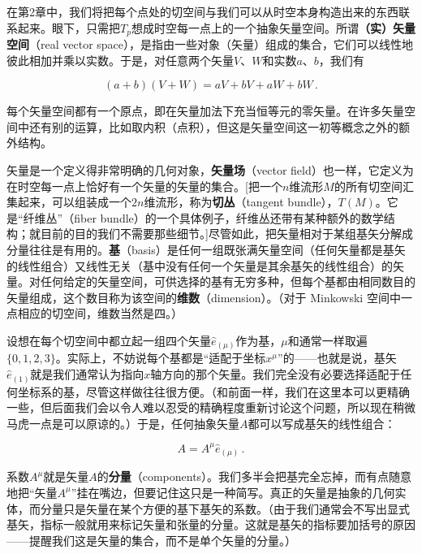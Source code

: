 在第2章中，我们将把每个点处的切空间与我们可以从时空本身构造出来的东西联系起来。眼下，只需把$T_p$想成时空每一点上的一个抽象矢量空间。所谓\textbf{（实）矢量空间}（real vector space），是指由一些对象（矢量）组成的集合，它们可以线性地彼此相加并乘以实数。于是，对任意两个矢量$V$、$W$和实数$a$、$b$，我们有

\begin{equation*}
(a+b)(V+W)=aV+bV+aW+bW\,.
\tag{1.36}
\end{equation*}

每个矢量空间都有一个原点，即在矢量加法下充当恒等元的零矢量。在许多矢量空间中还有别的运算，比如取内积（点积），但这是矢量空间这一初等概念之外的额外结构。

矢量是一个定义得非常明确的几何对象，\textbf{矢量场}（vector field）也一样，它定义为在时空每一点上恰好有一个矢量的矢量的集合。[把一个$n$维流形$M$的所有切空间汇集起来，可以组装成一个$2n$维流形，称为\textbf{切丛}（tangent bundle），$T(M)$。它是“纤维丛”（fiber bundle）的一个具体例子，纤维丛还带有某种额外的数学结构；就目前的目的我们不需要那些细节。]尽管如此，把矢量相对于某组基矢分解成分量往往是有用的。\textbf{基}（basis）是任何一组既张满矢量空间（任何矢量都是基矢的线性组合）又线性无关（基中没有任何一个矢量是其余基矢的线性组合）的矢量。对任何给定的矢量空间，可供选择的基有无穷多种，但每个基都由相同数目的矢量组成，这个数目称为该空间的\textbf{维数}（dimension）。（对于 Minkowski 空间中一点相应的切空间，维数当然是四。）


设想在每个切空间中都立起一组四个矢量$\hat{e}_{(\mu)}$作为基，$\mu$和通常一样取遍$\{0,1,2,3\}$。实际上，不妨说每个基都是“适配于坐标$x^\mu$”的——也就是说，基矢$\hat{e}_{(1)}$就是我们通常认为指向$x$轴方向的那个矢量。我们完全没有必要选择适配于任何坐标系的基，尽管这样做往往很方便。（和前面一样，我们在这里本可以更精确一些，但后面我们会以令人难以忍受的精确程度重新讨论这个问题，所以现在稍微马虎一点是可以原谅的。）于是，任何抽象矢量$A$都可以写成基矢的线性组合：

\begin{equation*}
A=A^{\mu}\hat{e}_{(\mu)}\,.
\tag{1.37}
\end{equation*}

系数$A^{\mu}$就是矢量$A$的\textbf{分量}（components）。我们多半会把基完全忘掉，而有点随意地把“矢量$A^{\mu}$”挂在嘴边，但要记住这只是一种简写。真正的矢量是抽象的几何实体，而分量只是矢量在某个方便的基下基矢的系数。（由于我们通常会不写出显式基矢，指标一般就用来标记矢量和张量的分量。这就是基矢的指标要加括号的原因——提醒我们这是矢量的集合，而不是单个矢量的分量。）

